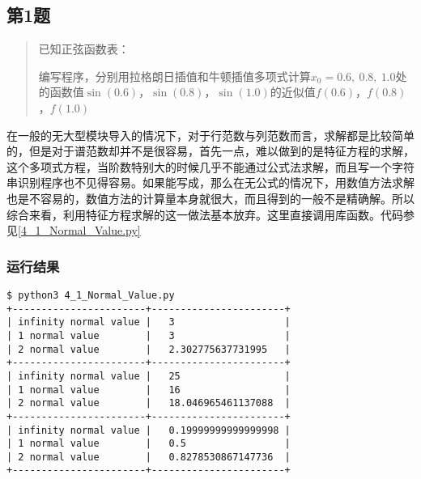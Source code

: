 \subsection{第1题}
\begin{quote}
    {\kaishu
    已知正弦函数表：
    \begin{table}[]
        \centering
    \end{table}
    编写程序，分别用拉格朗日插值和牛顿插值多项式计算$x_0=0.6,\ 0.8,\ 1.0$处的函数值$\sin(0.6)$，$\sin(0.8)$，$\sin(1.0)$的近似值$f(0.6)$，$f(0.8)$，$f(1.0)$
    }
\end{quote}

在一般的无大型模块导入的情况下，对于行范数与列范数而言，求解都是比较简单的，但是对于谱范数却并不是很容易，首先一点，难以做到的是特征方程的求解，这个多项式方程，当阶数特别大的时候几乎不能通过公式法求解，而且写一个字符串识别程序也不见得容易。如果能写成，那么在无公式的情况下，用数值方法求解也是不容易的，数值方法的计算量本身就很大，而且得到的一般不是精确解。所以综合来看，利用特征方程求解的这一做法基本放弃。这里直接调用库函数。代码参见\ref{4_1_Normal_Value.py}

\subsubsection{运行结果}

\begin{lstlisting}[style = bash]
$ python3 4_1_Normal_Value.py 
+-----------------------+-----------------------+
| infinity normal value |   3                   |
| 1 normal value        |   3                   |
| 2 normal value        |   2.302775637731995   |
+-----------------------+-----------------------+
| infinity normal value |   25                  |
| 1 normal value        |   16                  |
| 2 normal value        |   18.046965461137088  |
+-----------------------+-----------------------+
| infinity normal value |   0.19999999999999998 |
| 1 normal value        |   0.5                 |
| 2 normal value        |   0.8278530867147736  |
+-----------------------+-----------------------+
\end{lstlisting}

